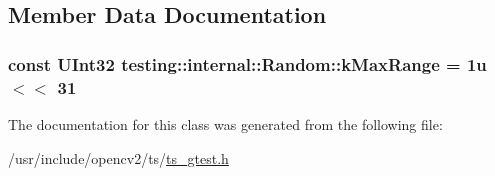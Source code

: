 \subsection{Member Data Documentation}
\hypertarget{classtesting_1_1internal_1_1Random_a36d72dd7063d0b5338f229e75382fdd2}{
\subsubsection[{k\-Max\-Range}]{\setlength{\rightskip}{0pt plus 5cm}const {\bf U\-Int32} testing\-::internal\-::\-Random\-::k\-Max\-Range = 1u $<$$<$ 31\hspace{0.3cm}{\ttfamily [static]}}}\label{classtesting_1_1internal_1_1Random_a36d72dd7063d0b5338f229e75382fdd2}


The documentation for this class was generated from the following file\-:\begin{DoxyCompactItemize}
\item 
/usr/include/opencv2/ts/\hyperlink{ts__gtest_8h}{ts\-\_\-gtest.\-h}\end{DoxyCompactItemize}
